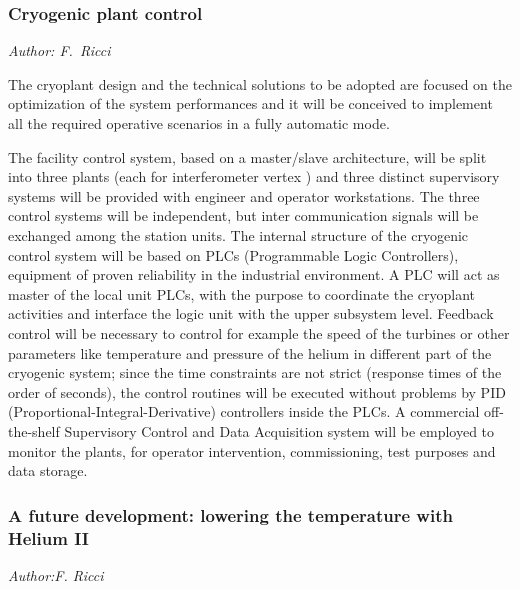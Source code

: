 \FloatBarrier

\subsubsection{Cryogenic plant control}
\label{sec:cryo_comtrol}
\emph{
Author: F.\ Ricci}

The cryoplant design and the technical solutions to be adopted are focused on the optimization of  the system performances and it will be conceived  to implement all the required operative scenarios in a fully automatic mode.

The facility control system, based on a master/slave architecture,   will be split into three plants (each for interferometer vertex ) and three distinct supervisory systems will be  provided with engineer and operator workstations. The three control systems will be  independent, but inter communication signals will be exchanged among the station units.
The internal structure of the cryogenic control system will be based on PLCs (Programmable Logic Controllers), equipment of proven reliability in the industrial environment. A PLC will act as master of the local unit PLCs, with the purpose to coordinate the cryoplant activities and interface the logic unit with the upper subsystem level. Feedback control will be necessary to control for example the speed of the turbines or other parameters like temperature and pressure of the helium in different part of the cryogenic system; since the time constraints are not strict (response times of the order of seconds), the control routines will be executed without problems by PID (Proportional-Integral-Derivative) controllers inside the PLCs. A commercial off-the-shelf Supervisory Control and Data Acquisition system will be employed to monitor the plants, for operator intervention, commissioning, test purposes and data storage.


\FloatBarrier
 \subsubsection{A  future development: lowering the temperature  with Helium II}
\label{sec:Helium_II}
\emph{
Author:F. Ricci}

